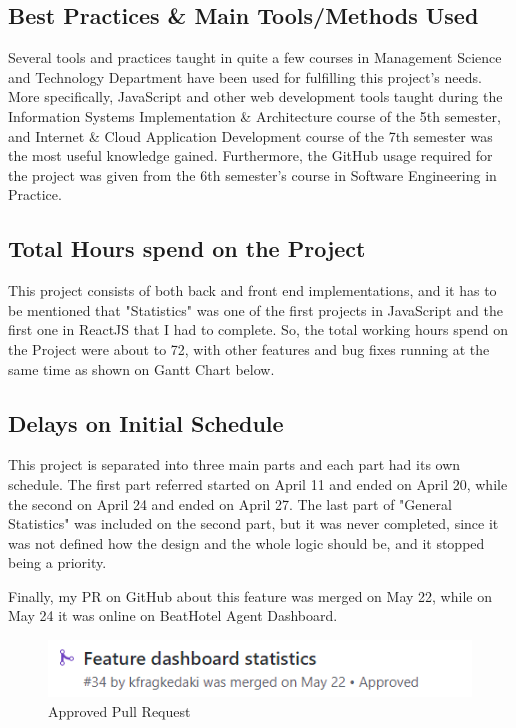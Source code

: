 \subsection{Best Practices \& Main Tools/Methods Used}

Several tools and practices taught in quite a few courses in Management Science and Technology Department have been used for fulfilling this project's needs. More specifically, JavaScript and other web development tools taught during the Information Systems Implementation \& Architecture course of the 5th semester, and Internet \& Cloud Application Development course of the 7th semester was the most useful knowledge gained. Furthermore, the GitHub usage required for the project was given from the 6th semester's course in Software Engineering in Practice. \par

\subsection{Total Hours spend on the Project}

This project consists of both back and front end implementations, and it has to be mentioned that "Statistics" was one of the first projects in JavaScript and the first one in ReactJS that I had to complete. So, the total working hours spend on the Project were about to 72, with other features and bug fixes running at the same time as shown on Gantt Chart below. \par

\subsection{Delays on Initial Schedule}

This project is separated into three main parts and each part had its own schedule. The first part referred started on April 11 and ended on April 20, while the second on April 24 and ended on April 27. The last part of "General Statistics" was included on the second part, but it was never completed, since it was not defined how the design and the whole logic should be, and it stopped being a priority. \par

Finally, my PR on GitHub about this feature was merged on May 22, while on May 24 it was online on BeatHotel Agent Dashboard.

\begin{figure}[H]
	\begin{center}
		\includegraphics[scale=0.85]{images/my_projects/Statistics/feature-dashboard-statistics-PR.png}
	\end{center}
	\caption{Approved Pull Request}
\end{figure}

